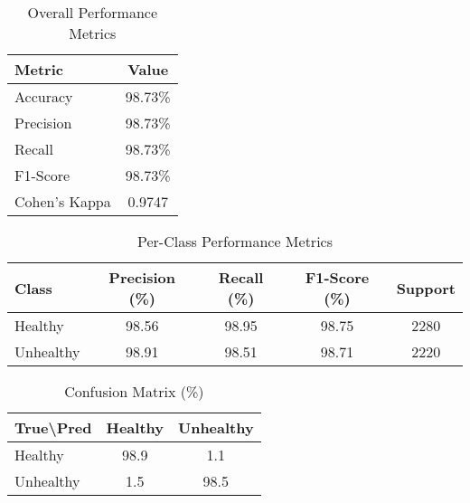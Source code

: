 
\begin{table}[h]
\centering
\caption{Overall Performance Metrics}
\begin{tabular}{lc}
\hline
Metric & Value \\
\hline
Accuracy & 98.73\% \\
Precision & 98.73\% \\
Recall & 98.73\% \\
F1-Score & 98.73\% \\
Cohen's Kappa & 0.9747 \\
\hline
\end{tabular}
\end{table}

\begin{table}[h]
\centering
\caption{Per-Class Performance Metrics}
\begin{tabular}{lcccc}
\hline
Class & Precision (\%) & Recall (\%) & F1-Score (\%) & Support \\
\hline
Healthy & 98.56 & 98.95 & 98.75 & 2280 \\
Unhealthy & 98.91 & 98.51 & 98.71 & 2220 \\
\hline
\end{tabular}
\end{table}

\begin{table}[h]
\centering
\caption{Confusion Matrix (\%)}
\begin{tabular}{l|cc}
\hline
True\textbackslash Pred & Healthy & Unhealthy \\
\hline
Healthy & 98.9 & 1.1 \\
Unhealthy & 1.5 & 98.5 \\
\hline
\end{tabular}
\end{table}
